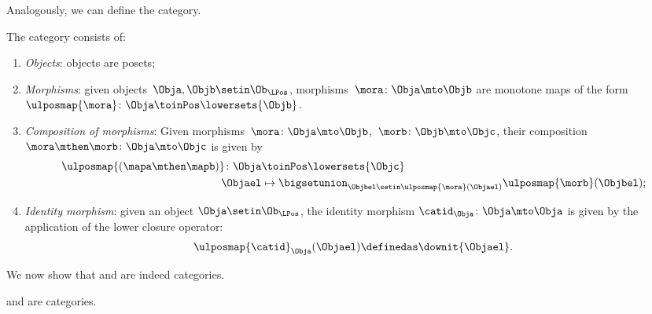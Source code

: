 Analogously, we can define the \LPos category.
\begin{definition}
    \label{def:lpos_cat}
    The category \LPos consists of:
    \begin{enumerate}
        \item \emph{Objects}: objects are posets;
        \item \emph{Morphisms}: given objects~$\Obja,\Objb\setin \Ob_{\LPos}$, morphisms~$\mora\colon \Obja\mto \Objb$ are monotone maps of the form~$\ulposmap{\mora} \colon \Obja \toinPos \lowersets{\Objb}$.
        \item \emph{Composition of morphisms}: Given morphisms~$\mora \colon \Obja \mto \Objb$,~$\morb \colon \Objb\mto \Objc$, their composition~$\mora\mthen \morb\colon \Obja\mto \Objc$ is given by
              \begin{equation}
                  \begin{aligned}
                      \ulposmap{(\mapa \mthen \mapb)} \colon \Obja & \toinPos \lowersets{\Objc} \\
                      \Objael                                      & \mapsto \bigsetunion_{\Objbel\setin \ulposmap{\mora} (\Objael)}\ulposmap{\morb}(\Objbel);
                  \end{aligned}
              \end{equation}
        \item \emph{Identity morphism}: given an object $\Obja\setin \Ob_{\LPos}$, the identity morphism $\catid_\Obja \colon \Obja \mto \Obja$ is given by the application of the lower closure operator:
              \begin{equation}
                  \ulposmap{\catid}_\Obja(\Objael)\definedas \downit\{\Objael\}.
              \end{equation}
    \end{enumerate}
\end{definition}

We now show that \UPos and \LPos are indeed categories.

\begin{lemma}
    \label{lem:upos_lpos_cats}
    \UPos and \LPos are categories.
\end{lemma}

